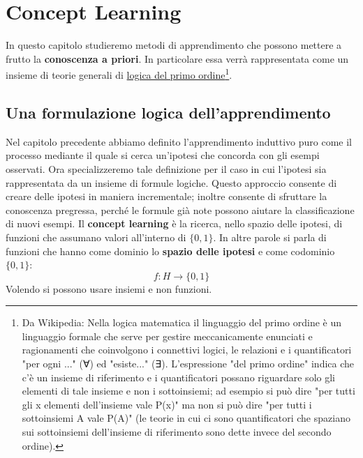 \chapter{Concept Learning}
\label{Capitolo 2}
In questo capitolo studieremo metodi di apprendimento che possono mettere a frutto la \textbf{conoscenza a priori}. In particolare essa verrà rappresentata come un insieme di teorie generali di \href{https://it.wikipedia.org/wiki/Linguaggio_del_primo_ordine}{logica del primo ordine\footnote{Da Wikipedia: Nella logica matematica il linguaggio del primo ordine è un linguaggio formale che serve per gestire meccanicamente enunciati e ragionamenti che coinvolgono i connettivi logici, le relazioni e i quantificatori "per ogni ..." (∀) ed "esiste..." (∃). L'espressione "del primo ordine" indica che c'è un insieme di riferimento e i quantificatori possano riguardare solo gli elementi di tale insieme e non i sottoinsiemi; ad esempio si può dire "per tutti gli x elementi dell'insieme vale P(x)" ma non si può dire "per tutti i sottoinsiemi A vale P(A)" (le teorie in cui ci sono quantificatori che spaziano sui sottoinsiemi dell'insieme di riferimento sono dette invece del secondo ordine).}}.
\section{Una formulazione logica dell'apprendimento}
Nel capitolo precedente abbiamo definito l'apprendimento induttivo puro come il processo mediante il quale si cerca un'ipotesi che concorda con gli esempi osservati. Ora specializzeremo tale definizione per il caso in cui l'ipotesi sia rappresentata da un insieme di formule logiche. Questo approccio consente di creare delle ipotesi in maniera incrementale; inoltre consente di sfruttare la conoscenza pregressa, perché le formule già note possono aiutare la classificazione di nuovi esempi. Il \textbf{concept learning} è la ricerca, nello spazio delle ipotesi, di funzioni che assumano valori all'interno di $\{0, 1\}$. In altre parole si parla di funzioni che hanno come dominio lo \textbf{spazio delle ipotesi} e come codominio $\{0, 1\}$:
\[f:H\to\{0, 1\}\]
Volendo si possono usare insiemi e non funzioni.\\
